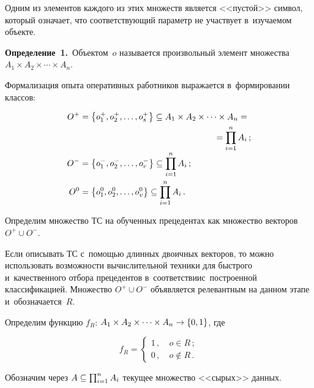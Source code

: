 \begin{multicols}{2}
  \vspace*{-12pt}
  
  Одним из элементов каждого из этих множеств является <<пустой>> символ, 
который означает, что соответствующий параметр не участвует в~изу\-ча\-емом 
объекте. 
  
  \smallskip
  
  \noindent
  \textbf{Определение~1.}\ Объектом~$o$ называется произвольный элемент 
множества $A_1\times A_2\times \cdots \times A_n$. 
  
  \smallskip
  
  Формализация опыта оперативных работников выражается в~формировании 
классов:

\vspace*{-2pt}

\noindent
  \begin{align*}
  O^+ &=\left\{ o_1^+, o_2^+, \ldots , o_s^+\right\}\subseteq A_1\times A_2\times 
\cdots \times A_n={}\\
&\hspace*{55mm}{}=\prod\limits^n_{i=1} A_i\,;\\[-3pt]
  O^- &= \left\{ o_1^-, o_2^-, \ldots , o_r^-\right\} \subseteq \prod\limits^n_{i=1} 
A_i\,;\\
  O^0 &= \left\{ o_1^0, o_2^0, \ldots , o_v^0\right\} \subseteq \prod\limits^n_{i=1} 
A_i\,.
  \end{align*}
  
  \vspace*{-4pt}
  
  Определим множество ТС на обученных прецедентах как множество 
векторов $O^+\cup O^-$.
  
  Если описывать ТС с~помощью длинных двоичных векторов, то можно 
использовать возможности вычислительной техники для быстрого 
и~качественного отбора прецедентов в~соответствии\linebreak с~построенной 
классификацией. Множество $O^+\cup O^-$ объявляется релевантным на 
данном этапе и~обозначается~$R$. 
  
  Определим функцию $f_R$: $A_1\times A_2\times\cdots\times A_n\hm\to 
\{0,1\}$, где 

\noindent
  $$
  f_R=\begin{cases}
  1\,, &\ o\in R\,;\\
  0\,, &\ o\notin R\,.
  \end{cases}
  $$
  
  Обозначим через $A\hm\subseteq \prod\nolimits^n_{i=1} A_i$ текущее 
множество <<сырых>> данных. 
  

\end{multicols}
